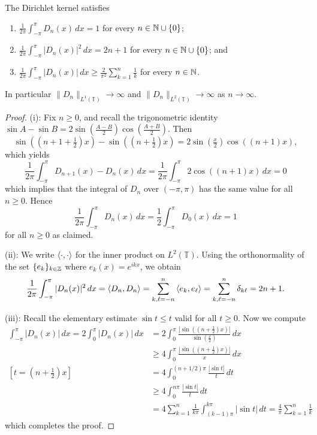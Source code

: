 \begin{lemma}
	The Dirichlet kernel satisfies
	\begin{enumerate}[\upshape (i)]
		\item $\displaystyle\frac{1}{2\pi}\displaystyle\int_{-\pi}^{\pi} D_n(x) \,dx = 1$ for every $n\in\mathbb{N} \cup \{0\}$;
		\item $\displaystyle\frac{1}{2\pi}\displaystyle\int_{-\pi}^{\pi} |D_n(x)|^2 \,dx = 2n+1$ for every $n\in\mathbb{N} \cup \{0\}$; and
		\item $\displaystyle\frac{1}{2\pi}\displaystyle\int_{-\pi}^{\pi} |D_n(x)| \,dx \ge \frac{2}{\pi^2} \sum_{k=1}^n \frac{1}{k}$ for every $n\in\mathbb{N}$.
	\end{enumerate}
	In particular $\|D_n\|_{L^1(\mathbb{T})} \to \infty$ and $\|D_n\|_{L^2(\mathbb{T})} \to \infty$ as $n\to\infty$.
\end{lemma}

\begin{proof}
	(i): Fix $n \ge 0$, and recall the trigonometric identity $\sin A - \sin B = 2\sin(\tfrac{A-B}{2})\cos(\tfrac{A+B}{2})$. Then
	\begin{equation*}
		\sin((n+1+\tfrac{1}{2})x) - \sin((n+\tfrac{1}{2})x) = 2\sin(\tfrac{x}{2})\cos((n+1)x),
	\end{equation*}
	which yields
	\begin{equation*}
		\frac{1}{2\pi}\int_{-\pi}^\pi D_{n+1}(x) - D_n(x) \,dx = \frac{1}{2\pi}\int_{-\pi}^\pi 2 \cos((n+1)x) \,dx = 0
	\end{equation*}
	which implies that the integral of $D_n$ over $(-\pi,\pi)$ has the same value for all $n\ge 0$. Hence
	\begin{equation*}
		\frac{1}{2\pi}\int_{-\pi}^\pi D_n(x) \,dx = \frac{1}{2}\int_{-\pi}^\pi D_0(x) \,dx = 1
	\end{equation*}
	for all $n \ge 0$ as claimed.
	
	(ii): We write $\braket{\cdot, \cdot}$ for the inner product on $L^2(\mathbb{T})$. Using the orthonormality of the set $\{e_k\}_{k\in\mathbb{Z}}$ where $e_k(x) = e^{ikx}$, we obtain
	\begin{equation*}
		\frac{1}{2\pi}\int_{-\pi}^\pi |D_n(x)|^2 \,dx = \braket{D_n, D_n} = \sum_{k,\ell = -n}^n \braket{e_k,e_\ell} = \sum_{k,\ell=-n}^n \delta_{k\ell} = 2n+1.
	\end{equation*}
	
	(iii): Recall the elementary estimate $\sin t \le t$ valid for all $t\ge 0$. Now we compute
	\begin{align*}
		\int_{-\pi}^\pi |D_n(x)|\,dx = 2\int_0^\pi |D_n(x)|\,dx &= 2\int_0^\pi \frac{|\sin((n+\tfrac{1}{2})x)|}{\sin(\tfrac{x}{2})} \,dx \\
		&\ge 4\int_0^\pi \frac{|\sin((n+\tfrac{1}{2})x)|}{x} \,dx \\
		[t = (n+\tfrac{1}{2})x] \quad &= 4\int_0^{(n+1/2)\pi} \frac{|\sin t|}{t} \,dt \\
		&\ge 4\int_0^{n\pi} \frac{|\sin t|}{t}\,dt \\
		&= 4\sum_{k=1}^n \frac{1}{k\pi} \int_{(k-1)\pi}^{k\pi} |\sin t|\,dt = \frac{4}{\pi} \sum_{k=1}^n \frac{1}{k}
	\end{align*}
	which completes the proof.
\end{proof}

